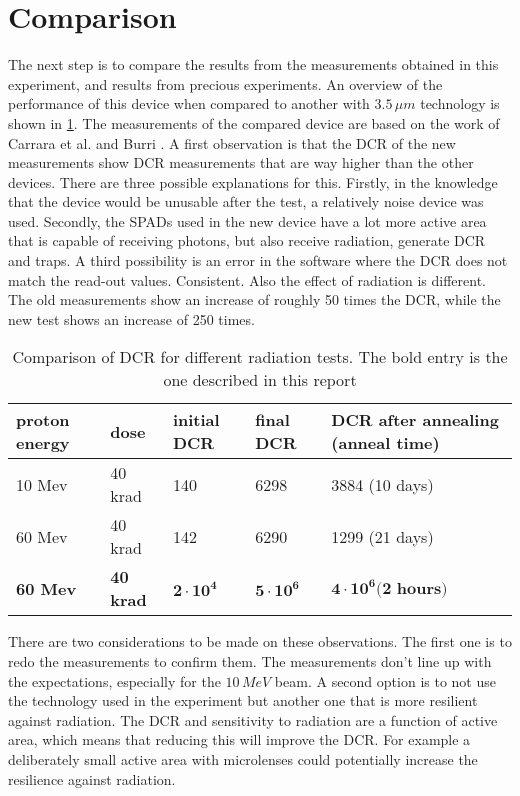 \clearpage
\section{Comparison}\label{ssec:results}

The next step is to compare the results from the measurements obtained in this experiment, and results from precious experiments. An overview of the performance of this device when compared to another with $3.5\,\mu m$ technology is shown in \cref{tab:comparison}. The measurements of the compared device are based on the work of Carrara et al. \cite{carrara2009gamma} and Burri \cite{burri2016thesis}. A first observation is that the DCR of the new measurements show DCR measurements that are way higher than the other devices. There are three possible explanations for this. Firstly, in the knowledge that the device would be unusable after the test, a relatively noise device was used. Secondly, the SPADs used in the new device have a lot more active area that is capable of receiving photons, but also receive radiation, generate DCR and traps. A third possibility is an error in the software where the DCR does not match the read-out values. Consistent. Also the effect of radiation is different. The old measurements show an increase of roughly 50 times the DCR, while the new test shows an increase of 250 times.

\begin{table}[h]
		\centering
\caption{Comparison of DCR for different radiation tests. The bold entry is the one described in this report}
\label{tab:comparison}
\begin{tabular}{|ll|lll|} \hline
\textbf{proton energy} & dose             & initial DCR       & final DCR         & DCR after annealing (anneal time) \\ \hline
10 Mev                 & 40 krad          & 140               & 6298              & 3884 (10 days)                    \\
60 Mev                 & 40 krad          & 142               & 6290              & 1299 (21 days)                    \\
\textbf{60 Mev}        & \textbf{40 krad} & $\mathbf{2\cdot10^4}$ & $\mathbf{5\cdot10^6}$ & $\mathbf{4\cdot10^6 \textbf{(2 hours)}}$      \\  \hline
\end{tabular}
\end{table}

There are two considerations to be made on these observations. The first one is to redo the measurements to confirm them. The measurements don't line up with the expectations, especially for the $10\,MeV$ beam. A second option is to not use the technology used in the experiment but another one that is more resilient against radiation. The DCR and sensitivity to radiation are a function of active area, which means that reducing this will improve the DCR. For example a deliberately small active area with microlenses could potentially increase the resilience against radiation.
